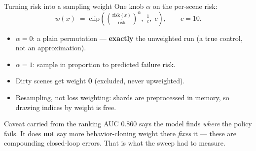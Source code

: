 \begin{frame}{Turning risk into a sampling weight}
  \small
  One knob $\alpha$ on the per-scene risk:
  \[
    w(x) \;=\; \mathrm{clip}\!\left(\left(\tfrac{\mathrm{risk}(x)}{\overline{\mathrm{risk}}}\right)^{\!\alpha},\;
    \tfrac{1}{c},\; c\right), \qquad c=10 .
  \]
  \begin{itemize}
    \item $\alpha=0$: a plain permutation --- \textbf{exactly} the unweighted
          run (a true control, not an approximation).
    \item $\alpha=1$: sample in proportion to predicted failure risk.
    \item Dirty scenes get weight \textbf{0} (excluded, never upweighted).
    \item Resampling, not loss weighting: shards are preprocessed in memory, so
          drawing indices by weight is free.
  \end{itemize}
  \begin{alertblock}{Caveat carried from the ranking}
    AUC 0.860 says the model finds \emph{where} the policy fails. It does
    \textbf{not} say more behavior-cloning weight there \emph{fixes} it --- these
    are compounding closed-loop errors. That is what the sweep had to measure.
  \end{alertblock}
\end{frame}

